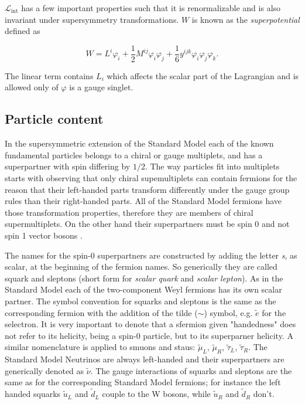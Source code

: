  $\mathcal{L}_{\mathrm{int}}$ has a few important properties such that it is renormalizable and is also invariant under supersymmetry transformations. $W$ is known as the \textit{superpotential} defined as 

\begin{equation}
W = L^i\varphi_i + \frac{1}{2}M^{ij}\varphi_i\varphi_j + \frac{1}{6}y^{ijk}\varphi_i\varphi_j\varphi_k.
\label{eq::superpotential}
\end{equation}

The linear term contains $L_i$ which affects the scalar part of the Lagrangian and is allowed only of $\varphi$ is a gauge singlet.


\subsection{Particle content}

\FloatBarrier

In the supersymmetric extension of the Standard Model each of the known fundamental particles belongs to a chiral or gauge multiplets, and has a superpartner with spin differing by $1/2$. The way particles fit into multiplets starts with observing that only chiral supemultiplets can contain fermions for the reason that their left-handed parts transform differently under the gauge group rules than their right-handed parts. All of the Standard Model fermions have those transformation properties, therefore they are members of chiral supermultiplets. On the other hand their superpartners must be spin 0 and not spin 1 vector bosons \cite{Martin:1997ns}.

The names for the spin-0 superpartners are constructed by adding the letter \textit{s}, as scalar, at the beginning of the fermion names. So generically they are called squark and sleptons (short form for \textit{scalar quark} and \textit{scalar lepton}). As in the Standard Model each of the two-component Weyl fermions has its own scalar partner. The symbol convention for squarks and sleptons is the same as the corresponding fermion with the addition of the tilde ($\sim$) symbol, e.g. $\widetilde{e}$ for the selectron. It is very important to denote that a sfermion given "handedness" does not refer to its helicity, being a spin-0 particle, but to its superparner helicity. A similar nomenclature is applied to smuons and staus: $\widetilde{\mu}_{L}$, $\widetilde{\mu}_{R}$, $\widetilde{\tau}_{L}$, $\widetilde{\tau}_{R}$. The Standard Model Neutrinos are always left-handed and their superpartners are generically denoted as $\widetilde{\nu}$. The gauge interactions of squarks and sleptons are the same as for the corresponding Standard Model fermions; for instance the left handed squarks $\widetilde{u}_{L}$ and $\widetilde{d}_{L}$ couple to the W bosons, while $\widetilde{u}_{R}$ and $\widetilde{d}_{R}$ don't.

